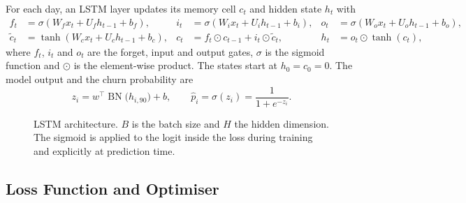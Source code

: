 \documentclass{article}
\begin{document}
For each day, an LSTM layer updates its memory cell $c_t$ and hidden state $h_t$ with
\begin{align}
f_t &= \sigma(W_f x_t + U_f h_{t-1} + b_f), &
i_t &= \sigma(W_i x_t + U_i h_{t-1} + b_i), &
o_t &= \sigma(W_o x_t + U_o h_{t-1} + b_o), \\
\tilde{c}_t &= \tanh(W_c x_t + U_c h_{t-1} + b_c), &
c_t &= f_t \odot c_{t-1} + i_t \odot \tilde{c}_t, &
h_t &= o_t \odot \tanh(c_t),
\end{align}
where $f_t$, $i_t$ and $o_t$ are the forget, input and output gates, $\sigma$ is the sigmoid function and $\odot$ is the element-wise product. The states start at $h_0 = c_0 = 0$. The model output and the churn probability are
\begin{equation}
z_i = w^\top \operatorname{BN}\big(h_{i,90}\big) + b, \qquad \hat{p}_i = \sigma(z_i) = \frac{1}{1 + e^{-z_i}} .
\end{equation}

\begin{figure}[H]
\centering
{}
\caption{LSTM architecture. $B$ is the batch size and $H$ the hidden dimension. The sigmoid is applied to the logit inside the loss during training and explicitly at prediction time.}
\label{fig:w2_arch}
\end{figure}

\subsection{Loss Function and Optimiser}
\end{document}
